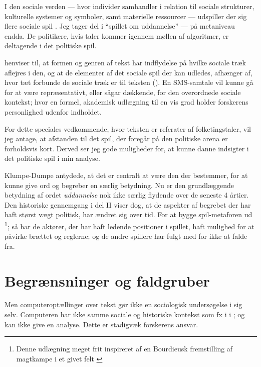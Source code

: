I den sociale verden — hvor individer samhandler i relation til sociale strukturer, kulturelle systemer og symboler, samt materielle ressourcer — udspiller der sig flere sociale spil \autocite[s. 23]{evansMachineTranslationMining2016}.
Jeg tager del i “spillet om uddannelse” --- på metaniveau endda.
De politikere, hvis taler kommer igennem møllen af algoritmer, er deltagende i det politiske spil.

\citeauthor{evansComputationSociologicalImagination2019} henviser til, at formen og genren af tekst har indflydelse på hvilke sociale træk aflejres i den, og at de elementer af det sociale spil der kan udledes, afhænger af, hvor tæt forbunde de sociale træk er til teksten (\citeyear[s. 23f]{evansMachineTranslationMining2016}). 
En SMS-samtale vil kunne gå for at være repræsentativt, eller sågar dækkende, for den overordnede sociale kontekst; hvor en formel, akademisk udlægning til en vis grad holder forskerens personlighed udenfor indholdet.

For dette speciales vedkommende, hvor teksten er referater af folketingstaler, vil jeg antage, at afstanden til det spil, der foregår på den politiske arena er forholdsvis kort.
Derved ser jeg gode muligheder for, at kunne danne indsigter i det politiske spil i min analyse.

Klumpe-Dumpe antydede, at det er centralt at være den der bestemmer, for at kunne give ord og begreber en særlig betydning.
Nu er den grundlæggende betydning af ordet \textit{uddannelse} nok ikke særlig flydende over de seneste 4 årtier.
Den historiske gennemgang i del II viser dog, at de aspekter af begrebet der har haft størst vægt politisk, har ændret sig over tid.
For at bygge spil-metaforen ud \footnote{Denne udlægning meget frit inspireret af en Bourdieusk fremstilling af magtkampe i et givet felt \autocite[kap.
1]{bourdieuFieldCulturalProduction2004}}; så har de aktører, der har haft ledende positioner i spillet, haft mulighed for at påvirke brættet og reglerne; og de andre spillere har fulgt med for ikke at falde fra.

\section{Begrænsninger og faldgruber}

Men computeroptællinger over tekst gør ikke en sociologisk undersøgelse i sig selv.
Computeren har ikke samme sociale og historiske kontekst som fx i \citeauthor{juulDiskurserOmUngdom2013} i ; og kan ikke give en analyse.
Dette er stadigvæk forskerens ansvar.

